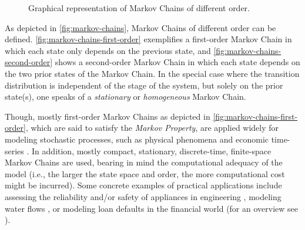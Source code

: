 \begin{figure}[t!]
	\captionsetup[subfigure]{justification=centering}
	\centering
	 \quad
	\caption{Graphical representation of Markov Chains of different order.}
	\label{fig:markov-chains}
\end{figure}

As depicted in \autoref{fig:markov-chains}, Markov Chains of different order can be defined. \autoref{fig:markov-chains-first-order} exemplifies a first-order Markov Chain in which each state only depends on the previous state, and \autoref{fig:markov-chains-second-order} shows a second-order Markov Chain in which each state depends on the two prior states of the Markov Chain.
In the special case where the transition distribution is independent of the stage of the system, but solely on the prior state(s), one speaks of a \textit{stationary} or \textit{homogeneous} Markov Chain.

Though, mostly first-order Markov Chains as depicted in \autoref{fig:markov-chains-first-order}, which are said to satisfy the \textit{Markov Property}, are applied widely for modeling stochastic processes, such as physical phenomena and economic time-series \cite{bacciu2015probabilistic}.
In addition, mostly compact, stationary, discrete-time, finite-space Markov Chains are used, bearing in mind the computational adequacy of the model (i.e., the larger the state space and order, the more computational cost might be incurred).
Some concrete examples of practical applications include assessing the reliability and/or safety of appliances in engineering \cite{cochran2001generic, cronvall2009combining,el2008optimal}, modeling water flows \cite{parent1991stochastic}, or modeling loan defaults \cite{grimshaw2011markov} in the financial world (for an overview see \cite{pasanisi2012estimating}).

